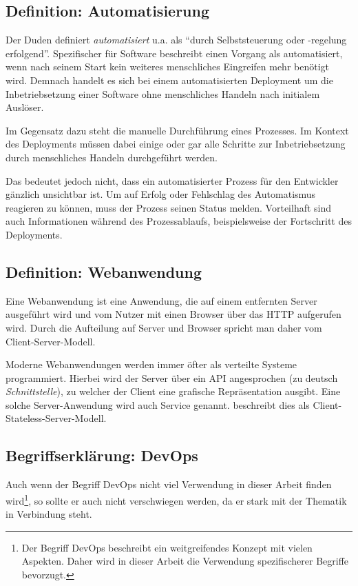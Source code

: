 \subsection{Definition: Automatisierung}

Der Duden \citeyearpar{Duden} definiert \emph{automatisiert} u.a. als ``durch Selbststeuerung oder -regelung erfolgend''. Spezifischer für Software beschreibt \citet[27]{Duvall2007} einen Vorgang als automatisiert, wenn nach seinem Start kein weiteres menschliches Eingreifen mehr benötigt wird. Demnach handelt es sich bei einem automatisierten Deployment um die Inbetriebsetzung einer Software ohne menschliches Handeln nach initialem Auslöser.

Im Gegensatz dazu steht die manuelle Durchführung eines Prozesses. Im Kontext des Deployments müssen dabei einige oder gar alle Schritte zur Inbetriebsetzung durch menschliches Handeln durchgeführt werden.

Das bedeutet jedoch nicht, dass ein automatisierter Prozess für den Entwickler gänzlich unsichtbar ist. Um auf Erfolg oder Fehlschlag des Automatismus reagieren zu können, muss der Prozess seinen Status melden. Vorteilhaft sind auch Informationen während des Prozessablaufs, beispielsweise der Fortschritt des Deployments. \citep[10f]{Duvall2007}

\subsection{Definition: Webanwendung}

Eine Webanwendung ist eine Anwendung, die auf einem entfernten Server ausgeführt wird und vom Nutzer mit einen Browser über das \ac{HTTP} aufgerufen wird. Durch die Aufteilung auf Server und Browser spricht man daher vom Client-Server-Modell. \citep{wiki:webanwendung}

Moderne Webanwendungen werden immer öfter als verteilte Systeme programmiert. Hierbei wird der Server über ein \ac{API} angesprochen (zu deutsch \emph{Schnittstelle}), zu welcher der Client eine grafische Repräsentation ausgibt. Eine solche Server-Anwendung wird auch Service genannt. \citet[Kapitel 5.1.3]{Fielding} beschreibt dies als Client-Stateless-Server-Modell.

\subsection{Begriffserklärung: DevOps}
\label{subsec:devops}

Auch wenn der Begriff DevOps nicht viel Verwendung in dieser Arbeit finden wird\footnote{Der Begriff DevOps beschreibt ein weitgreifendes Konzept mit vielen Aspekten. Daher wird in dieser Arbeit die Verwendung spezifischerer Begriffe bevorzugt.}, so sollte er auch nicht verschwiegen werden, da er stark mit der Thematik in Verbindung steht.


